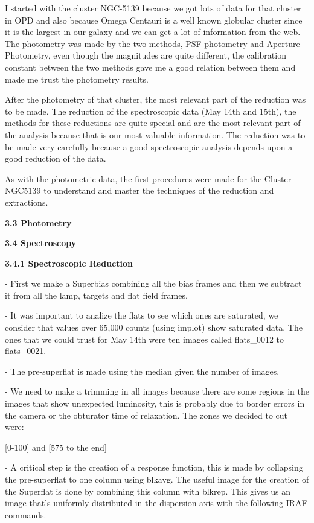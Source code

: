 \documentclass[english]{article}
\begin{document}
I started with the cluster NGC-5139 because we got lots of data for that cluster in OPD and also because Omega Centauri is a well known globular cluster since it is the largest in our galaxy and we can get a lot of information from the web. The photometry was made by the two methods, PSF photometry and Aperture Photometry, even though the magnitudes are quite different, the calibration constant between the two methods gave me a good relation between them and made me trust the photometry results.

After the photometry of that cluster, the most relevant part of the reduction was to be made. The reduction of the spectroscopic data (May 14th and 15th), the methods for these reductions are quite special and are the most relevant part of the analysis because that is our most valuable information. The reduction was to be made very carefully because a good spectroscopic analysis depends upon a good reduction of the data. 

As with the photometric data, the first procedures were made for the Cluster NGC5139 to understand and master the techniques of the reduction and extractions.


\textbf{{\Large 3.3 Photometry}}

\textbf{{\Large 3.4 Spectroscopy}}

\textbf{{\large 3.4.1 Spectroscopic Reduction}}

- First we make a Superbias combining all the bias frames and then we subtract it from all the lamp, targets and flat field frames.

- It was important to analize the flats to see which ones are saturated, we consider that values over 65,000 counts (using implot) show saturated data. The ones that we could trust for May 14th were ten images called flats\_0012 to flats\_0021.

- The pre-superflat is made using the median given the number of images.

- We need to make a trimming in all images because there are some regions in the images that show unexpected luminosity, this is probably due to border errors in the camera or the obturator time of relaxation. The zones we decided to cut were:

[0-100] and [575 to the end]

- A critical step is the creation of a response function, this is made by collapsing the pre-superflat to one column using blkavg. The useful image for the creation of the Superflat is done by combining this column with blkrep. This gives us an image that's uniformly distributed in the dispersion axis with the following IRAF commands.
\end{document}
